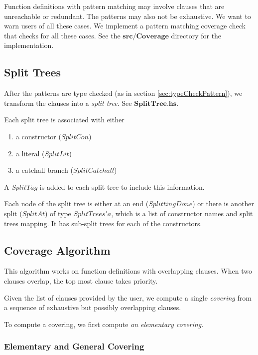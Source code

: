 Function definitions with pattern matching may involve clauses that are unreachable or redundant. The patterns may also not be exhaustive. We want to warn users of all these cases. We implement a pattern matching coverage check that checks for all these cases. See the $\boldsymbol{src/Coverage}$ directory for the implementation.

\subsection{Split Trees}

After the patterns are type checked (as in section \ref{sec:typeCheckPattern}), we transform the clauses into a \textit{split tree}. See $\boldsymbol{SplitTree.hs}$.

Each split tree is associated with either 

\begin{enumerate}
  \item a constructor ($SplitCon$)
  \item a literal ($SplitLit$)
  \item a catchall branch ($SplitCatchall$)
\end{enumerate}

A $SplitTag$ is added to each split tree to include this information. 

Each node of the split tree is either at an end ($SplittingDone$) or there is another split ($SplitAt$) of type $SplitTrees' a$, which is a list of constructor names and split trees mapping. It has sub-split trees for each of the constructors.

\subsection{Coverage Algorithm}

This algorithm works on function definitions with overlapping clauses. When two clauses overlap, the top most clause takes priority.

Given the list of clauses provided by the user, we compute a single \textit{covering} from a sequence of exhaustive but possibly overlapping clauses.

To compute a covering, we first compute \textit{an elementary covering}.

\subsubsection{Elementary and General Covering}

